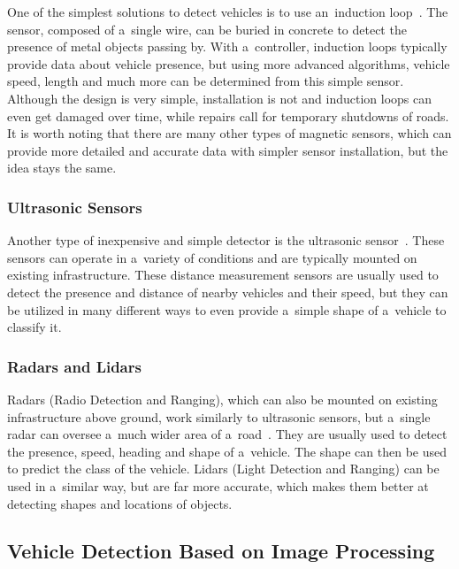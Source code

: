 One of the simplest solutions to detect vehicles is to use an~induction
loop~\cite{MagneticSensors}. The sensor, composed of a~single wire, can be buried
in concrete to detect the presence of metal objects passing by. With
a~controller, induction loops typically provide data about vehicle presence, but
using more advanced algorithms, vehicle speed, length and much more
can be determined from this simple sensor. Although the design is very simple,
installation is not and induction loops can even get damaged over time, while
repairs call for temporary shutdowns of roads. It is worth noting that there
are many other types of magnetic sensors, which can provide more detailed and
accurate data with simpler sensor installation, but the idea stays the same.


\subsubsection*{Ultrasonic Sensors}

Another type of inexpensive and simple detector is the ultrasonic
sensor~\cite{UltrasonicSensors}. These sensors can operate in a~variety of
conditions and are typically mounted on existing infrastructure. These distance
measurement sensors are usually used to detect the presence and distance of nearby
vehicles and their speed, but they can be utilized in many different ways to
even provide a~simple shape of a~vehicle to classify it.


\subsubsection*{Radars and Lidars}

Radars (Radio Detection and Ranging), which can also be mounted on existing
infrastructure above ground, work similarly to ultrasonic sensors, but a~single
radar can oversee a~much wider area of a~road~\cite{RadarSensors}. They are
usually used to detect the presence, speed, heading and shape of a~vehicle. The
shape can then be used to predict the class of the vehicle. Lidars (Light
Detection and Ranging) can be used in a~similar way, but are far more accurate,
which makes them better at detecting shapes and locations of objects.



\subsection{Vehicle Detection Based on Image Processing}

